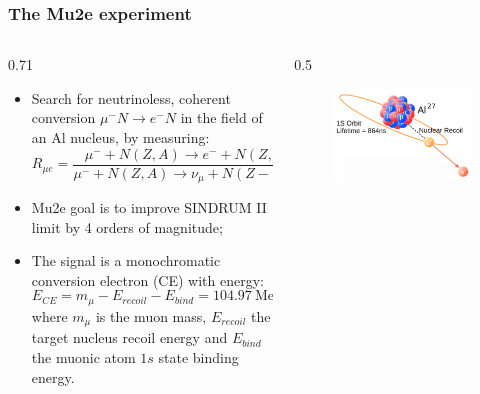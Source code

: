 \documentclass{beamer}
\begin{document}
\begin{frame}
    \frametitle{The Mu2e experiment}
    \vspace{-3mm}
\begin{columns}
    \begin{column}{0.71\framewidth}
        \begin{itemize}
            \item Search for neutrinoless, coherent conversion $\mu^- N \rightarrow e^- N$ in the field of an Al nucleus, by measuring: 
            $$R_{\mu e}=\frac{\mu^{-}+N(Z, A) \rightarrow e^{-}+N(Z, A)}{\mu^{-}+N(Z, A) \rightarrow \nu_\mu+N(Z-1, A)}$$
            \item Mu2e goal is to improve SINDRUM II limit by 4 orders of magnitude;
            \item The signal is a monochromatic conversion electron (CE) with energy: 
            $$ E_{CE} = m_\mu - E_{recoil} - E_{bind} = 104.97 \ \text{MeV}$$
            where $m_\mu$ is the muon mass, $E_{recoil}$ the target nucleus recoil energy and $E_{bind}$ the muonic atom $1s$ state binding energy.
        \end{itemize}
    \end{column}
    \begin{column}{0.5\framewidth}
    
                \begin{figure}[h]
            \centering
            \includegraphics[width=0.75\columnwidth]{figures/png/Screenshot_20240913_160115.png}
        \end{figure} 
    \end{column}
\end{columns}
\end{frame}
\end{document}
